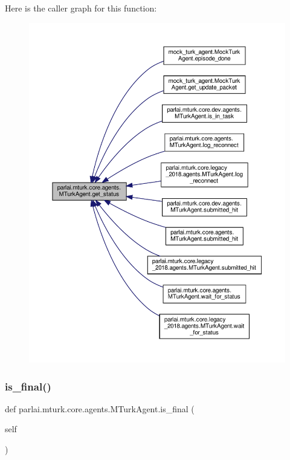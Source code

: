 Here is the caller graph for this function\+:
\nopagebreak
\begin{figure}[H]
\begin{center}
\leavevmode
\includegraphics[width=350pt]{classparlai_1_1mturk_1_1core_1_1agents_1_1MTurkAgent_a0522b17872a4a9a22e2c0e5237f8ac82_icgraph}
\end{center}
\end{figure}
\mbox{\label{classparlai_1_1mturk_1_1core_1_1agents_1_1MTurkAgent_ab7e57409d6591f78a3b9d28c5a0f98e6}} 
\subsubsection{\texorpdfstring{is\+\_\+final()}{is\_final()}}
{\footnotesize\ttfamily def parlai.\+mturk.\+core.\+agents.\+M\+Turk\+Agent.\+is\+\_\+final (\begin{DoxyParamCaption}\item[{}]{self }\end{DoxyParamCaption})}

